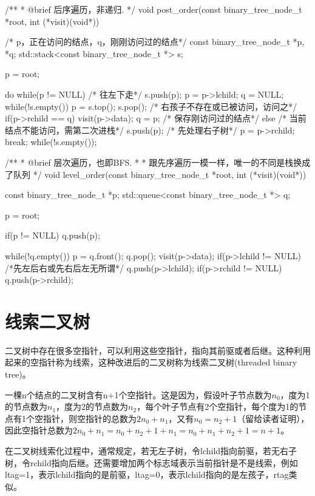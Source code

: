 \begin{Codex}[label=binary_tree.cpp]
/** 
 * @brief 后序遍历，非递归.
 */
void post_order(const binary_tree_node_t *root, 
                int (*visit)(void*)) {
    /* p，正在访问的结点，q，刚刚访问过的结点*/
    const binary_tree_node_t *p, *q;
    std::stack<const binary_tree_node_t *> s;

    p = root;

    do {
        while(p != NULL) { /* 往左下走*/
            s.push(p);
            p = p->lchild;
        }
        q = NULL;
        while(!s.empty()) {
            p = s.top();
            s.pop();
            /* 右孩子不存在或已被访问，访问之*/
            if(p->rchild == q) {
                visit(p->data);
                q = p; /* 保存刚访问过的结点*/
            } else {
                /* 当前结点不能访问，需第二次进栈*/
                s.push(p);
                /* 先处理右子树*/
                p = p->rchild;
                break;
            }
        }
    }while(!s.empty());
}

/** 
 * @brief 层次遍历，也即BFS.
 *
 * 跟先序遍历一模一样，唯一的不同是栈换成了队列
 */
void level_order(const binary_tree_node_t *root, 
                 int (*visit)(void*)) {
    const binary_tree_node_t *p;
    std::queue<const binary_tree_node_t *> q;

    p = root;

    if(p != NULL) {
        q.push(p);
    }

    while(!q.empty()) {
        p = q.front();
        q.pop();
        visit(p->data);
        if(p->lchild != NULL) { /*先左后右或先右后左无所谓*/
            q.push(p->lchild);
        }
        if(p->rchild != NULL) {
            q.push(p->rchild);
        }
    }
}
\end{Codex}

\section{线索二叉树} %
二叉树中存在很多空指针，可以利用这些空指针，指向其前驱或者后继。这种利用起来的空指针称为线索，这种改进后的二叉树称为线索二叉树(threaded binary tree)。

一棵n个结点的二叉树含有n+1个空指针。这是因为，假设叶子节点数为$n_0$，度为1的节点数为$n_1$，度为2的节点数为$n_2$，每个叶子节点有2个空指针，每个度为1的节点有1个空指针，则空指针的总数为$2n_0+n_1$，又有$n_0=n_2+1$（留给读者证明），因此空指针总数为$2n_0+n_1=n_0+n_2+1+n_1=n_0+n_1+n_2+1=n+1$。

在二叉树线索化过程中，通常规定，若无左子树，令lchild指向前驱，若无右子树，令rchild指向后继。还需要增加两个标志域表示当前指针是不是线索，例如ltag=1，表示lchild指向的是前驱，ltag=0，表示lchild指向的是左孩子，rtag类似。

